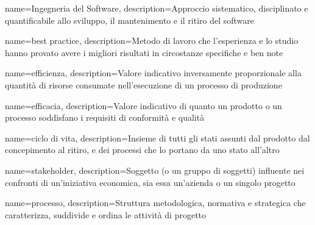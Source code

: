 {
	name={Ingegneria del Software},
	description={Approccio sistematico, disciplinato e quantificabile allo sviluppo, il mantenimento e il ritiro del software}
}

{
	name={best practice},
	description={Metodo di lavoro che l'esperienza e lo studio hanno provato avere i migliori risultati in circostanze specifiche e ben note}
}

{
	name=efficienza,
	description={Valore indicativo inversamente proporzionale alla quantità di risorse consumate nell'esecuzione di un processo di produzione}
}

{
	name=efficacia,
	description={Valore indicativo di quanto un prodotto o un processo soddisfano i requisiti di conformità e qualità}
}

{
	name={ciclo di vita},
	description={Insieme di tutti gli stati assunti dal prodotto dal concepimento al ritiro, e dei processi che lo portano da uno stato all'altro}
}

{
	name=stakeholder,
	description={Soggetto (o un gruppo di soggetti) influente nei confronti di un'iniziativa economica, sia essa un'azienda o un singolo progetto}
}

{
	name={processo},
	description={Struttura metodologica, normativa e strategica che caratterizza, suddivide e ordina le attività di progetto}
}
